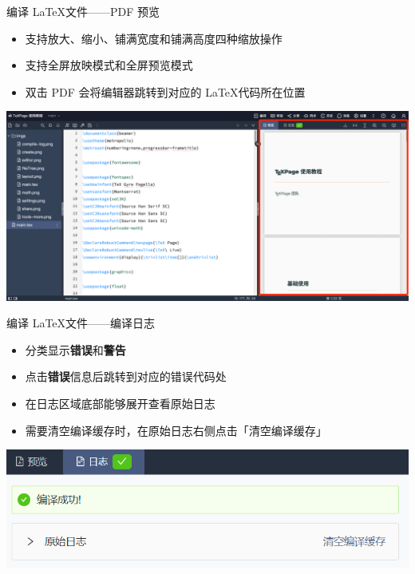 \documentclass{beamer}
\newenvironment{display}{\trivlist\item[]}{\endtrivlist}
\begin{document}
\begin{frame}{编译 \LaTeX 文件\hfill ——PDF 预览}
\begin{itemize}
\item 支持放大、缩小、铺满宽度和铺满高度四种缩放操作
\item 支持全屏放映模式和全屏预览模式
\item 双击 PDF 会将编辑器跳转到对应的 \LaTeX 代码所在位置
\end{itemize}

\begin{display}
\includegraphics[width=\textwidth]{imgs/preview.png}
\end{display}

\end{frame}


\begin{frame}{编译 \LaTeX 文件\hfill ——编译日志}
\begin{itemize}
\item 分类显示\textbf{\color{red}错误}和\textbf{\color{orange}警告}
\item 点击\textbf{\color{red}错误}信息后跳转到对应的错误代码处
\item 在日志区域底部能够展开查看原始日志
\item 需要清空编译缓存时，在原始日志右侧点击「清空编译缓存」
\end{itemize}

\begin{display}
\includegraphics[width=\textwidth]{imgs/compile-log.png}
\end{display}

\end{frame}
\end{document}
